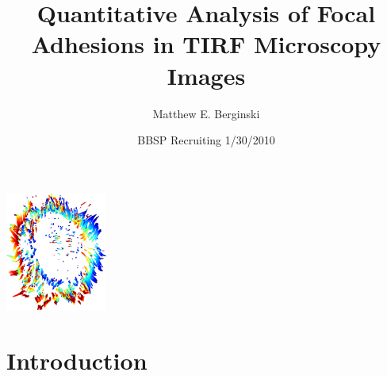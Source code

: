 \documentclass{beamer}
\title[FA Characterization]{Quantitative Analysis of Focal Adhesions in TIRF
Microscopy Images}
\author[] %
{Matthew E. Berginski}
\institute[]{University of North Carolina at Chapel Hill}
\date[BBSP Recruiting 1/30/2010]{BBSP Recruiting 1/30/2010}
\begin{document}
\begin{frame}
	\titlepage
	\begin{center}
	\includegraphics[width=0.25\textwidth]{ghost}
	\end{center}
\end{frame}

\section{Introduction}
\end{document}
